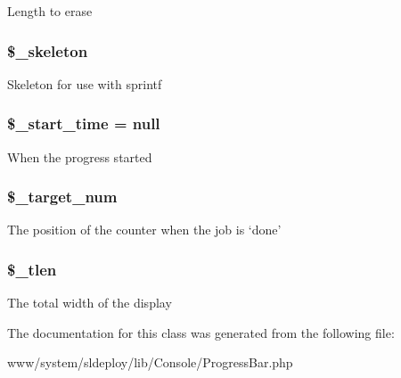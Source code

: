 \label{class_console___progress_bar_a9aa5141c3490e6a764486f24c4310688}
Length to erase \hypertarget{class_console___progress_bar_ac90eff90c2209a34f2d25a6e8c29db9f}{
\subsubsection[{\$\_\-skeleton}]{\setlength{\rightskip}{0pt plus 5cm}\$\_\-skeleton}}
\label{class_console___progress_bar_ac90eff90c2209a34f2d25a6e8c29db9f}
Skeleton for use with sprintf \hypertarget{class_console___progress_bar_a0951c7412928a0e59f4e1281233d40a1}{
\subsubsection[{\$\_\-start\_\-time}]{\setlength{\rightskip}{0pt plus 5cm}\$\_\-start\_\-time = null}}
\label{class_console___progress_bar_a0951c7412928a0e59f4e1281233d40a1}
When the progress started \hypertarget{class_console___progress_bar_ae1a56ac9f3bb48e8457e2a31144104e0}{
\subsubsection[{\$\_\-target\_\-num}]{\setlength{\rightskip}{0pt plus 5cm}\$\_\-target\_\-num}}
\label{class_console___progress_bar_ae1a56ac9f3bb48e8457e2a31144104e0}
The position of the counter when the job is `done' \hypertarget{class_console___progress_bar_aca842c2cc93576f62e80a7f939e345b5}{
\subsubsection[{\$\_\-tlen}]{\setlength{\rightskip}{0pt plus 5cm}\$\_\-tlen}}
\label{class_console___progress_bar_aca842c2cc93576f62e80a7f939e345b5}
The total width of the display 

The documentation for this class was generated from the following file:\begin{DoxyCompactItemize}
\item 
www/system/sldeploy/lib/Console/ProgressBar.php\end{DoxyCompactItemize}

